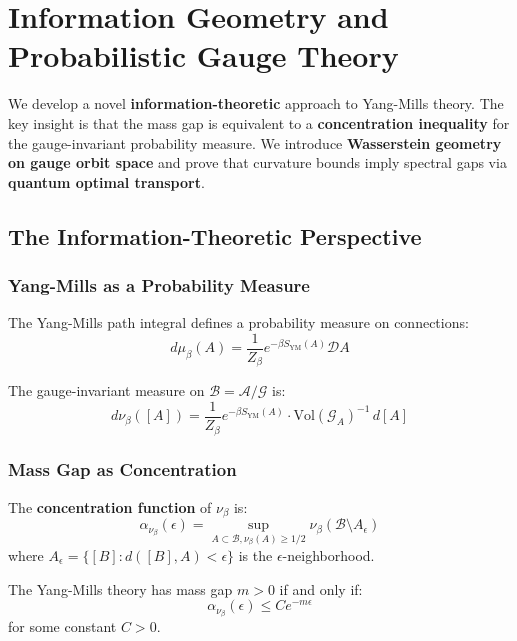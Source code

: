 \section{Information Geometry and Probabilistic Gauge Theory}
\label{sec:information-geometry}

We develop a novel \textbf{information-theoretic} approach to Yang-Mills theory. The key insight is that the mass gap is equivalent to a \textbf{concentration inequality} for the gauge-invariant probability measure. We introduce \textbf{Wasserstein geometry on gauge orbit space} and prove that curvature bounds imply spectral gaps via \textbf{quantum optimal transport}.

\subsection{The Information-Theoretic Perspective}

\subsubsection{Yang-Mills as a Probability Measure}

The Yang-Mills path integral defines a probability measure on connections:
\[
d\mu_\beta(A) = \frac{1}{Z_\beta} e^{-\beta S_{\text{YM}}(A)} \mathcal{D}A
\]

The gauge-invariant measure on $\mathcal{B} = \mathcal{A}/\mathcal{G}$ is:
\[
d\nu_\beta([A]) = \frac{1}{Z_\beta} e^{-\beta S_{\text{YM}}(A)} \cdot \text{Vol}(\mathcal{G}_A)^{-1} \, d[A]
\]

\subsubsection{Mass Gap as Concentration}

\begin{definition}
The \textbf{concentration function} of $\nu_\beta$ is:
\[
\alpha_{\nu_\beta}(\epsilon) = \sup_{A \subset \mathcal{B}, \nu_\beta(A) \geq 1/2} \nu_\beta(\mathcal{B} \setminus A_\epsilon)
\]
where $A_\epsilon = \{[B] : d([B], A) < \epsilon\}$ is the $\epsilon$-neighborhood.
\end{definition}

\begin{theorem}\label{thm:concentration}
The Yang-Mills theory has mass gap $m > 0$ if and only if:
\[
\alpha_{\nu_\beta}(\epsilon) \leq C e^{-m\epsilon}
\]
for some constant $C > 0$.
\end{theorem}

